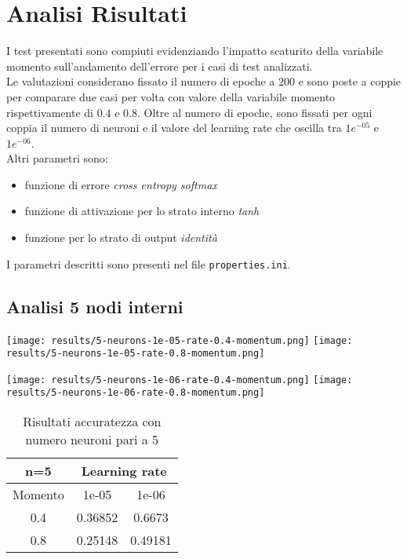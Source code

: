 \chapter{Analisi Risultati}
I test presentati sono compiuti evidenziando l'impatto scaturito della variabile momento sull'andamento dell'errore per i casi di test analizzati.\\
Le valutazioni considerano fissato il numero di epoche a $200$ e sono poste a coppie per comparare due casi per volta con valore della variabile momento rispettivamente di $0.4$ e $0.8$. Oltre al numero di epoche, sono fissati per ogni coppia il numero di neuroni e il valore del learning rate che oscilla tra $1e^{-05}$ e $1e^{-06}$. \\
Altri parametri sono: 
\begin{itemize}
    \item funzione di errore \textit{cross entropy softmax}
    \item funzione di attivazione per lo strato interno \textit{tanh}
    \item funzione per lo strato di output \textit{identità}
\end{itemize}
I parametri descritti sono presenti nel file \texttt{properties.ini}.
{\clearpage}
\section{Analisi 5 nodi interni}
\begin{center}
\texttt{[image: results/5-neurons-1e-05-rate-0.4-momentum.png]}
\texttt{[image: results/5-neurons-1e-05-rate-0.8-momentum.png]}
\end{center}

\begin{center}
\texttt{[image: results/5-neurons-1e-06-rate-0.4-momentum.png]}
\texttt{[image: results/5-neurons-1e-06-rate-0.8-momentum.png]}
\end{center}
\begin{table}[htbp]
    \centering
    \begin{tabular}{|c|c|c|}
    \hline
    n=5 & \multicolumn{2}{c|}{Learning rate} \\
    \hline
    Momento & 1e-05 & 1e-06 \\
    \hline
    0.4 & 0.36852 & 0.6673 \\
    \hline
    0.8 & 0.25148 & 0.49181 \\
    \hline
    \end{tabular}
    \caption{Risultati accuratezza con numero neuroni pari a 5}
\end{table}

